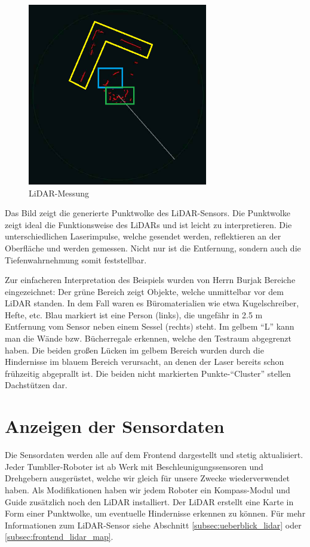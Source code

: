 \begin{figure}[H]
    \includegraphics[width=0.7\textwidth, center]{img/LiDARMessungZeichnung_alt.png}
    \caption{LiDAR-Messung}
    \label{fig:LiDAR-Messung}
\end{figure}

Das Bild zeigt die generierte Punktwolke des LiDAR-Sensors.
%
Die Punktwolke zeigt ideal die Funktionsweise des LiDARs
und ist leicht zu interpretieren.
%
Die unterschiedlichen Laserimpulse,
welche gesendet werden,
reflektieren an der Oberfläche und werden gemessen.
Nicht nur ist die Entfernung, sondern auch die Tiefenwahrnehmung somit feststellbar.

Zur einfacheren Interpretation des Beispiels
wurden von Herrn Burjak Bereiche eingezeichnet:
%
Der grüne Bereich zeigt Objekte,
welche unmittelbar vor dem LiDAR standen.
%
In dem Fall waren es Büromaterialien wie etwa Kugelschreiber, Hefte, etc.
%
Blau markiert ist eine Person (links),
die ungefähr in 2.5 m Entfernung vom Sensor
neben einem Sessel (rechts) steht.
%
Im gelbem ``L'' kann man die Wände bzw. Bücherregale erkennen,
welche den Testraum abgegrenzt haben.
Die beiden großen Lücken im gelbem Bereich wurden
durch die Hindernisse im blauem Bereich verursacht,
an denen der Laser bereits schon frühzeitig abgeprallt ist.
%
Die beiden nicht markierten Punkte-``Cluster'' stellen Dachstützen dar.

\section{Anzeigen der Sensordaten}
\label{subsec:frontend_sensors}
Die Sensordaten werden alle auf dem Frontend dargestellt und stetig aktualisiert.
%
Jeder Tumbller-Roboter ist ab Werk mit Beschleunigungssensoren und Drehgebern ausgerüstet,
welche wir gleich für unsere Zwecke wiederverwendet haben.
%
Als Modifikationen haben wir jedem Roboter ein Kompass-Modul
und Guide zusätzlich noch den LiDAR installiert.
%
Der LiDAR erstellt eine Karte in Form einer Punktwolke,
um eventuelle Hindernisse erkennen zu können.
%
Für mehr Informationen zum LiDAR-Sensor siehe Abschnitt \ref{subsec:ueberblick_lidar} oder \ref{subsec:frontend_lidar_map}.

